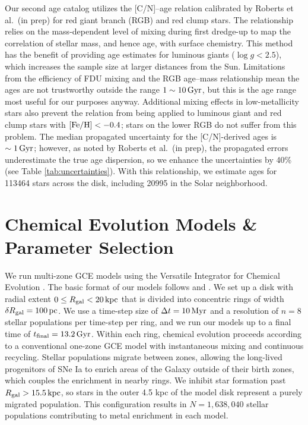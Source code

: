 \documentclass[twocolumn,twocolappendix,linenumbers]{aastex631}
\newcommand{\todo}[1]{{\color{red}#1}}
\newcommand{\mathFeH}{{\rm [Fe/H]}}
\newcommand{\kpc}{\,{\rm kpc}}
\newcommand{\Gyr}{\,{\rm Gyr}}
\begin{document}
Our second age catalog utilizes the [C/N]--age relation calibrated by \todo{Roberts et al.\ (in prep)} for red giant branch (RGB) and red clump stars. The relationship relies on the mass-dependent level of mixing during first dredge-up \citep[FDU;][]{iben_stellar_1967} to map the correlation of stellar mass, and hence age, with surface chemistry. This method has the benefit of providing age estimates for luminous giants ($\log g<2.5$), which increases the sample size at larger distances from the Sun. Limitations from the efficiency of FDU mixing and the RGB age--mass relationship mean the ages are not trustworthy outside the range $1\sim10\Gyr$, but this is the age range most useful for our purposes anyway. Additional mixing effects in low-metallicity stars %
also prevent the relation from being applied to luminous giant and red clump stars with $\mathFeH<-0.4$; stars on the lower RGB do not suffer from this problem. The median propagated uncertainty for the [C/N]-derived ages is $\sim1\Gyr$; however, as noted by \todo{Roberts et al.\ (in prep)}, the propagated errors underestimate the true age dispersion, so we enhance the uncertainties by 40\% (see Table \ref{tab:uncertainties}). With this relationship, we estimate ages for \num{113464} stars across the disk, including \num{20995} in the Solar neighborhood.

\section{Chemical Evolution Models \& Parameter Selection}
\label{sec:methods}

We run multi-zone GCE models using the Versatile Integrator for Chemical Evolution \citep[{\tt VICE};][]{johnson_impact_2020}. The basic format of our models follows \citet{johnson_stellar_2021} and \citet{dubay_galactic_2024}. We set up a disk with radial extent $0\leq R_{\rm gal}<20\kpc$ that is divided into concentric rings of width $\delta R_{\rm gal}=100\,{\rm pc}$. We use a time-step size of $\Delta t=10\,{\rm Myr}$ and a resolution of $n=8$ stellar populations per time-step per ring, and we run our models up to a final time of $t_{\rm final}=13.2\,{\rm Gyr}$. Within each ring, chemical evolution proceeds according to a conventional one-zone GCE model with instantaneous mixing and continuous recycling. Stellar populations migrate between zones, allowing the long-lived progenitors of SNe Ia to enrich areas of the Galaxy outside of their birth zones, which couples the enrichment in nearby rings. We inhibit star formation past $R_{\rm gal}>15.5\kpc$, so stars in the outer 4.5 kpc of the model disk represent a purely migrated population. This configuration results in $N=1,638,040$ stellar populations comtributing to metal enrichment in each model.
\end{document}
